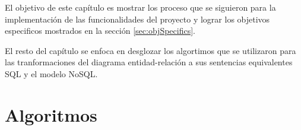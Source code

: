 El objetivo de este capítulo es mostrar los proceso que se siguieron para la implementación de las funcionalidades del proyecto y lograr los objetivos especificos mostrados en la sección \ref{sec:objSpecifics}.

El resto del capítulo se enfoca en desglozar los algortimos que se utilizaron para las tranformaciones del diagrama entidad-relación a sus sentencias equivalentes SQL y el modelo NoSQL. 

\section{Algoritmos}



